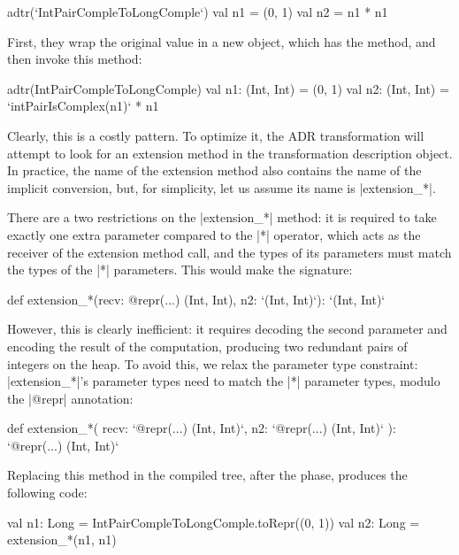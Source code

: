 \begin{lstlisting-nobreak}
adtr(`IntPairCompleToLongComple`) {
  val n1 = (0, 1)
  val n2 = n1 * n1
}
\end{lstlisting-nobreak}

First, they wrap the original value in a new object, which has the method, and then invoke this method:

\begin{lstlisting-nobreak}
adtr(IntPairCompleToLongComple) {
  val n1: (Int, Int) = (0, 1)
  val n2: (Int, Int) = `intPairIsComplex(n1)` * n1
}
\end{lstlisting-nobreak}

Clearly, this is a costly pattern. To optimize it, the ADR transformation will attempt to look for an extension method in the transformation description object. In practice, the name of the extension method also contains the name of the implicit conversion, but, for simplicity, let us assume its name is |extension_*|.

There are a two restrictions on the |extension_*| method: it is required to take exactly one extra parameter compared to the |*| operator, which acts as the receiver of the extension method call, and the types of its parameters must match the types of the |*| parameters. This would make the signature:

\begin{lstlisting-nobreak}
def extension_*(recv: @repr(...) (Int, Int), n2: `(Int, Int)`): `(Int, Int)`
\end{lstlisting-nobreak}

However, this is clearly inefficient: it requires decoding the second parameter and encoding the result of the computation, producing two redundant pairs of integers on the heap. To avoid this, we relax the parameter type constraint: |extension_*|'s parameter types need to match the |*| parameter types, modulo the |@repr| annotation:

\begin{lstlisting-nobreak}
def extension_*(
    recv: `@repr(...) (Int, Int)`,
    n2:   `@repr(...) (Int, Int)`
  ): `@repr(...) (Int, Int)`
\end{lstlisting-nobreak}

Replacing this method in the compiled tree, after the \commit{} phase, produces the following code:

\begin{lstlisting-nobreak}
val n1: Long = IntPairCompleToLongComple.toRepr((0, 1))
val n2: Long = extension_*(n1, n1)
\end{lstlisting-nobreak}

